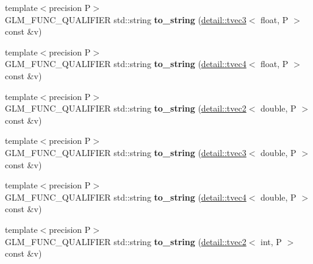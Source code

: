 \begin{DoxyCompactItemize}
\item 
{\footnotesize template$<$precision P$>$ }\\G\+L\+M\+\_\+\+F\+U\+N\+C\+\_\+\+Q\+U\+A\+L\+I\+F\+I\+ER std\+::string {\bfseries to\+\_\+string} (\hyperlink{structglm_1_1detail_1_1tvec3}{detail\+::tvec3}$<$ float, P $>$ const \&v)\hypertarget{namespaceglm_ada8090162e09080749f93e52ca6e1722}{}\label{namespaceglm_ada8090162e09080749f93e52ca6e1722}

\item 
{\footnotesize template$<$precision P$>$ }\\G\+L\+M\+\_\+\+F\+U\+N\+C\+\_\+\+Q\+U\+A\+L\+I\+F\+I\+ER std\+::string {\bfseries to\+\_\+string} (\hyperlink{structglm_1_1detail_1_1tvec4}{detail\+::tvec4}$<$ float, P $>$ const \&v)\hypertarget{namespaceglm_a0b90d4ba2c4c0d16a6bc71a80084a6d6}{}\label{namespaceglm_a0b90d4ba2c4c0d16a6bc71a80084a6d6}

\item 
{\footnotesize template$<$precision P$>$ }\\G\+L\+M\+\_\+\+F\+U\+N\+C\+\_\+\+Q\+U\+A\+L\+I\+F\+I\+ER std\+::string {\bfseries to\+\_\+string} (\hyperlink{structglm_1_1detail_1_1tvec2}{detail\+::tvec2}$<$ double, P $>$ const \&v)\hypertarget{namespaceglm_aacac89a227ca1a0dac8a43298ddccee5}{}\label{namespaceglm_aacac89a227ca1a0dac8a43298ddccee5}

\item 
{\footnotesize template$<$precision P$>$ }\\G\+L\+M\+\_\+\+F\+U\+N\+C\+\_\+\+Q\+U\+A\+L\+I\+F\+I\+ER std\+::string {\bfseries to\+\_\+string} (\hyperlink{structglm_1_1detail_1_1tvec3}{detail\+::tvec3}$<$ double, P $>$ const \&v)\hypertarget{namespaceglm_a2192a3fcadf236a82f9cafe2291e5343}{}\label{namespaceglm_a2192a3fcadf236a82f9cafe2291e5343}

\item 
{\footnotesize template$<$precision P$>$ }\\G\+L\+M\+\_\+\+F\+U\+N\+C\+\_\+\+Q\+U\+A\+L\+I\+F\+I\+ER std\+::string {\bfseries to\+\_\+string} (\hyperlink{structglm_1_1detail_1_1tvec4}{detail\+::tvec4}$<$ double, P $>$ const \&v)\hypertarget{namespaceglm_adc1be9dcab5836c228189fd8df32c4f2}{}\label{namespaceglm_adc1be9dcab5836c228189fd8df32c4f2}

\item 
{\footnotesize template$<$precision P$>$ }\\G\+L\+M\+\_\+\+F\+U\+N\+C\+\_\+\+Q\+U\+A\+L\+I\+F\+I\+ER std\+::string {\bfseries to\+\_\+string} (\hyperlink{structglm_1_1detail_1_1tvec2}{detail\+::tvec2}$<$ int, P $>$ const \&v)\hypertarget{namespaceglm_acf6a59b44afdda0d868ded648576d48f}{}\label{namespaceglm_acf6a59b44afdda0d868ded648576d48f}


\end{DoxyCompactItemize}
